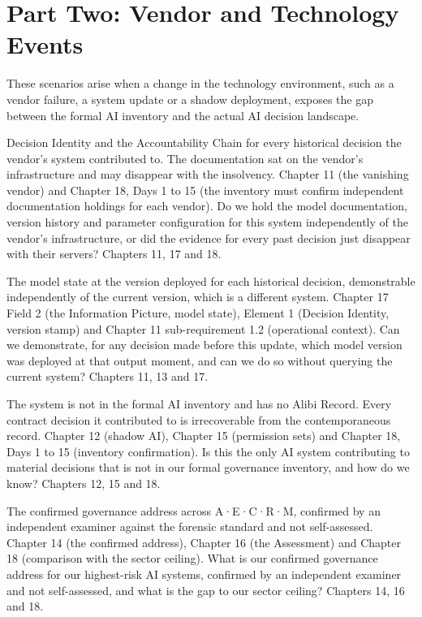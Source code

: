\section{Part Two: Vendor and Technology Events}

These scenarios arise when a change in the technology environment, such as a vendor failure, a system update or a shadow deployment, exposes the gap between the formal AI inventory and the actual AI decision landscape.

{Decision Identity and the Accountability Chain for every historical decision the vendor's system contributed to. The documentation sat on the vendor's infrastructure and may disappear with the insolvency.}
{Chapter 11 (the vanishing vendor) and Chapter 18, Days 1 to 15 (the inventory must confirm independent documentation holdings for each vendor).}
{Do we hold the model documentation, version history and parameter configuration for this system independently of the vendor's infrastructure, or did the evidence for every past decision just disappear with their servers?}
{Chapters 11, 17 and 18.}

{The model state at the version deployed for each historical decision, demonstrable independently of the current version, which is a different system.}
{Chapter 17 Field 2 (the Information Picture, model state), Element 1 (Decision Identity, version stamp) and Chapter 11 sub-requirement 1.2 (operational context).}
{Can we demonstrate, for any decision made before this update, which model version was deployed at that output moment, and can we do so without querying the current system?}
{Chapters 11, 13 and 17.}

{The system is not in the formal AI inventory and has no Alibi Record. Every contract decision it contributed to is irrecoverable from the contemporaneous record.}
{Chapter 12 (shadow AI), Chapter 15 (permission sets) and Chapter 18, Days 1 to 15 (inventory confirmation).}
{Is this the only AI system contributing to material decisions that is not in our formal governance inventory, and how do we know?}
{Chapters 12, 15 and 18.}

{The confirmed governance address across A·E·C·R·M, confirmed by an independent examiner against the forensic standard and not self-assessed.}
{Chapter 14 (the confirmed address), Chapter 16 (the Assessment) and Chapter 18 (comparison with the sector ceiling).}
{What is our confirmed governance address for our highest-risk AI systems, confirmed by an independent examiner and not self-assessed, and what is the gap to our sector ceiling?}
{Chapters 14, 16 and 18.}

